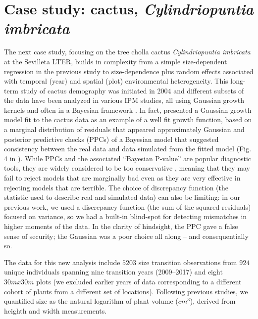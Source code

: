 \documentclass[11pt]{article}
\begin{document}
{\section{Case study: cactus, \emph{Cylindriopuntia imbricata}}
The next case study, focusing on the tree cholla cactus \emph{Cylindriopuntia imbricata} at the Sevilleta LTER, builds in complexity from a simple size-dependent regression in the previous study to size-dependence plus random effects associated with temporal (year) and spatial (plot) environmental heterogeneity. 
This long-term study of cactus demography was initiated in 2004 and different subsets of the data have been analyzed in various IPM studies, all using Gaussian growth kernels and often in a Bayesian framework \citep{miller2009impacts,czachurademographic,compagnoni2016effect,ohm2014balancing,elderd2016quantifying}.
In fact, \citep{elderd2016quantifying} presented a Gaussian growth model fit to the cactus data as an example of a well fit growth function, based on a marginal distribution of residuals that appeared approximately Gaussian and posterior predictive checks (PPCs) of a Bayesian model that suggested consistency between the real data and data simulated from the fitted model (Fig. 4 in \citep{elderd2016quantifying}). 
While PPCs and the associated ``Bayesian P-value'' are popular diagnostic tools, they are widely considered to be too conservative \citep{conn2018guide,zhang2014comparative}, meaning that they may fail to reject models that are marginally bad even as they are very effective in rejecting models that are terrible.
The choice of discrepancy function (the statistic used to describe real and simulated data) can also be limiting: in our previous work, we used a discrepancy function (the sum of the squared residuals) focused on variance, so we had a built-in blind-spot for detecting mismatches in higher moments of the data.
In the clarity of hindsight, the PPC gave a false sense of security; the Gaussian was a poor choice all along -- and consequentially so.

The data for this new analysis include $5203$ size transition observations from $924$ unique individuals spanning nine transition years (2009--2017) and eight $30m x 30m$ plots (we excluded earlier years of data corresponding to a different cohort of plants from a different set of locations). 
Following previous studies, we quantified size as the natural logarithm of plant volume ($cm^3$), derived from heighth and width measurements. 

}
\end{document}

